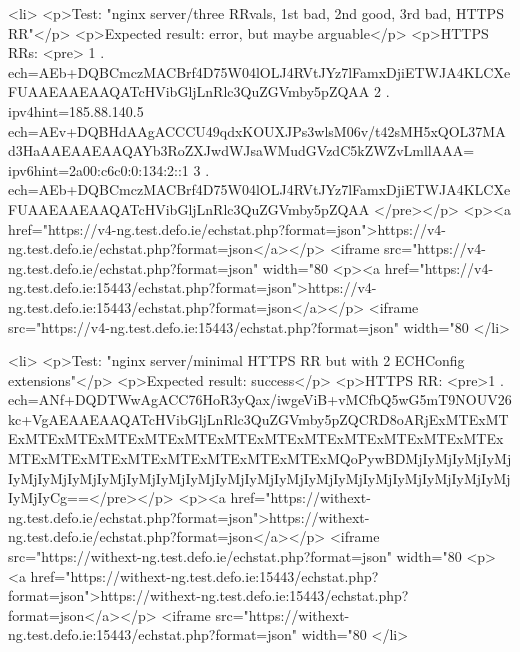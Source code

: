<li>
<p>Test: "nginx server/three RRvals, 1st bad, 2nd good, 3rd bad, HTTPS RR"</p>
<p>Expected result: error, but maybe arguable</p>
<p>HTTPS RRs: <pre>
1 . ech=AEb+DQBCmczMACBrf4D75W04lOLJ4RVtJYz7lFamxDjiETWJA4KLCXeFUAAEAAEAAQATcHVibGljLnRlc3QuZGVmby5pZQAA
2 . ipv4hint=185.88.140.5 ech=AEv+DQBHdAAgACCCU49qdxKOUXJPs3wlsM06v/t42sMH5xQOL37MAd3HaAAEAAEAAQAYb3RoZXJwdWJsaWMudGVzdC5kZWZvLmllAAA= ipv6hint=2a00:c6c0:0:134:2::1
3 . ech=AEb+DQBCmczMACBrf4D75W04lOLJ4RVtJYz7lFamxDjiETWJA4KLCXeFUAAEAAEAAQATcHVibGljLnRlc3QuZGVmby5pZQAA
</pre></p>
<p><a href="https://v4-ng.test.defo.ie/echstat.php?format=json">https://v4-ng.test.defo.ie/echstat.php?format=json</a></p>
<iframe src="https://v4-ng.test.defo.ie/echstat.php?format=json" width="80%
<p><a href="https://v4-ng.test.defo.ie:15443/echstat.php?format=json">https://v4-ng.test.defo.ie:15443/echstat.php?format=json</a></p>
<iframe src="https://v4-ng.test.defo.ie:15443/echstat.php?format=json" width="80%
</li>

<li>
<p>Test: "nginx server/minimal HTTPS RR but with 2 ECHConfig extensions"</p>
<p>Expected result: success</p>
<p>HTTPS RR: <pre>1 . ech=ANf+DQDTWwAgACC76HoR3yQax/iwgeViB+vMCfbQ5wG5mT9NOUV26kc+VgAEAAEAAQATcHVibGljLnRlc3QuZGVmby5pZQCRD8oARjExMTExMTExMTExMTExMTExMTExMTExMTExMTExMTExMTExMTExMTExMTExMTExMTExMTExMTExMTExMTExMTExMTExMQoPywBDMjIyMjIyMjIyMjIyMjIyMjIyMjIyMjIyMjIyMjIyMjIyMjIyMjIyMjIyMjIyMjIyMjIyMjIyMjIyMjIyMjIyMjIyCg==</pre></p>
<p><a href="https://withext-ng.test.defo.ie/echstat.php?format=json">https://withext-ng.test.defo.ie/echstat.php?format=json</a></p>
<iframe src="https://withext-ng.test.defo.ie/echstat.php?format=json" width="80%
<p><a href="https://withext-ng.test.defo.ie:15443/echstat.php?format=json">https://withext-ng.test.defo.ie:15443/echstat.php?format=json</a></p>
<iframe src="https://withext-ng.test.defo.ie:15443/echstat.php?format=json" width="80%
</li>

